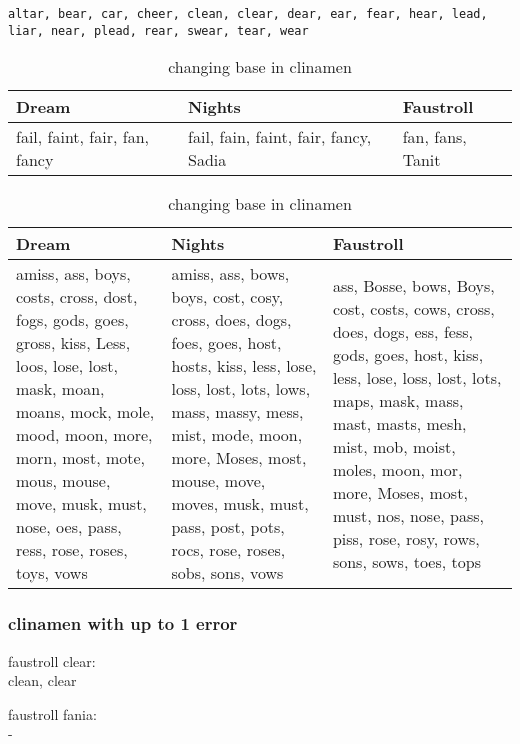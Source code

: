 \begin{verbatim}
altar, bear, car, cheer, clean, clear, dear, ear, fear, hear, lead, liar, near, plead, rear, swear, tear, wear
\end{verbatim}


\begin{table}
  \centering
  \begin{tabu}{X[l]X[1.5,l]X[l]}
  \toprule
  \textbf{Dream} & \textbf{Nights} & \textbf{Faustroll}\\
  \midrule
  fail, faint, fair, fan, fancy & fail, fain, faint, fair, fancy, Sadia & fan, fans, Tanit\\
  \bottomrule
  \end{tabu}
\caption[Changing base in clinamen]{changing base in clinamen}
\label{tab:basefania}
\end{table}

\begin{table}
  \centering
  \begin{tabu}{X[l]X[l]X[l]}
  \toprule
  \textbf{Dream} & \textbf{Nights} & \textbf{Faustroll}\\
  \midrule
  amiss, ass, boys, costs, cross, dost, fogs, gods, goes, gross, kiss, Less, loos, lose, lost, mask, moan, moans, mock, mole, mood, moon, more, morn, most, mote, mous, mouse, move, musk, must, nose, oes, pass, ress, rose, roses, toys, vows & amiss, ass, bows, boys, cost, cosy, cross, does, dogs, foes, goes, host, hosts, kiss, less, lose, loss, lost, lots, lows, mass, massy, mess, mist, mode, moon, more, Moses, most, mouse, move, moves, musk, must, pass, post, pots, rocs, rose, roses, sobs, sons, vows & ass, Bosse, bows, Boys, cost, costs, cows, cross, does, dogs, ess, fess, gods, goes, host, kiss, less, lose, loss, lost, lots, maps, mask, mass, mast, masts, mesh, mist, mob, moist, moles, moon, mor, more, Moses, most, must, nos, nose, pass, piss, rose, rosy, rows, sons, sows, toes, tops\\
  \bottomrule
  \end{tabu}
\caption[Changing base in clinamen]{changing base in clinamen}
\label{tab:basemoss}
\end{table}


\subsubsection{clinamen with up to 1 error}
faustroll clear:\\
clean, clear

faustroll fania:\\
-

